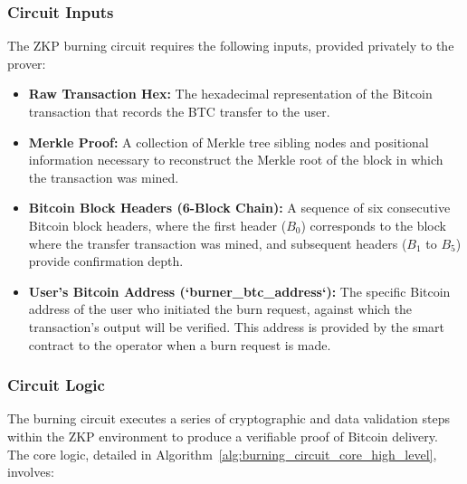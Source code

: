 \documentclass{DESSThesis}
\begin{document}
\subsubsection{Circuit Inputs}
The ZKP burning circuit requires the following inputs, provided privately to the prover:
\begin{itemize}
    \item \textbf{Raw Transaction Hex:} The hexadecimal representation of the Bitcoin transaction that records the BTC transfer to the user.
    \item \textbf{Merkle Proof:} A collection of Merkle tree sibling nodes and positional information necessary to reconstruct the Merkle root of the block in which the transaction was mined.
    \item \textbf{Bitcoin Block Headers (6-Block Chain):} A sequence of six consecutive Bitcoin block headers, where the first header ($B_0$) corresponds to the block where the transfer transaction was mined, and subsequent headers ($B_1$ to $B_5$) provide confirmation depth.
    \item \textbf{User's Bitcoin Address (`burner\_btc\_address`):} The specific Bitcoin address of the user who initiated the burn request, against which the transaction's output will be verified. This address is provided by the smart contract to the operator when a burn request is made.
\end{itemize}

\subsubsection{Circuit Logic}
The burning circuit executes a series of cryptographic and data validation steps within the ZKP environment to produce a verifiable proof of Bitcoin delivery. The core logic, detailed in Algorithm~\ref{alg:burning_circuit_core_high_level}, involves:
\end{document}
